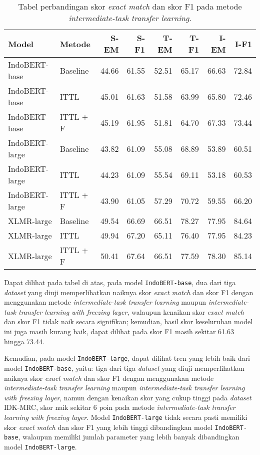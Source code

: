 \begin{table}[H]\centering
\begin{tabular}{llrrrrrr}
\toprule
         Model &   Metode &  S-EM &  S-F1 &  T-EM &  T-F1 &  I-EM &  I-F1 \\
\midrule
 IndoBERT-base & Baseline & 44.66 & 61.55 & 52.51 & 65.17 & 66.63 & 72.84 \\
 IndoBERT-base &     ITTL & 45.01 & 61.63 & 51.58 & 63.99 & 65.80 & 72.46 \\
 IndoBERT-base & ITTL + F & 45.19 & 61.95 & 51.81 & 64.70 & 67.33 & 73.44 \\
 \hline
IndoBERT-large & Baseline & 43.82 & 61.09 & 55.08 & 68.89 & 53.89 & 60.51 \\
IndoBERT-large &     ITTL & 44.23 & 61.09 & 55.54 & 69.11 & 53.18 & 60.53 \\
IndoBERT-large & ITTL + F & 43.90 & 61.05 & 57.29 & 70.72 & 59.55 & 66.20 \\
\hline
    XLMR-large & Baseline & 49.54 & 66.69 & 66.51 & 78.27 & 77.95 & 84.64 \\
    XLMR-large &     ITTL & 49.94 & 67.20 & 65.11 & 76.40 & 77.95 & 84.23 \\
    XLMR-large & ITTL + F & 50.41 & 67.64 & 66.51 & 77.59 & 78.30 & 85.14 \\
\bottomrule
\end{tabular}
\caption{Tabel perbandingan skor \emph{exact match} dan skor F1 pada metode \emph{intermediate-task transfer learning}.}
\end{table}

Dapat dilihat pada tabel di atas, pada model \texttt{IndoBERT-base}, dua dari tiga \emph{dataset} yang diuji memperlihatkan naiknya skor \emph{exact match} dan skor F1 dengan menggunakan metode \emph{intermediate-task transfer learning} maupun \emph{intermediate-task transfer learning with freezing layer}, walaupun kenaikan skor \emph{exact match} dan skor F1 tidak naik secara signifikan; kemudian, hasil skor keseluruhan model ini juga masih kurang baik, dapat dilihat pada skor F1 masih sekitar 61.63 hingga 73.44.

Kemudian, pada model \texttt{IndoBERT-large}, dapat dilihat tren yang lebih baik dari model \texttt{IndoBERT-base}, yaitu: tiga dari tiga \emph{dataset} yang diuji memperlihatkan naiknya skor \emph{exact match} dan skor F1 dengan menggunakan metode \emph{intermediate-task transfer learning} maupun \emph{intermediate-task transfer learning with freezing layer}, namun dengan kenaikan skor yang cukup tinggi pada \emph{dataset} IDK-MRC, skor naik sekitar 6 poin pada metode \emph{intermediate-task transfer learning with freezing layer}. Model \texttt{IndoBERT-large} tidak secara pasti memiliki skor \emph{exact match} dan skor F1 yang lebih tinggi dibandingkan model \texttt{IndoBERT-base}, walaupun memiliki jumlah parameter yang lebih banyak dibandingkan model \texttt{IndoBERT-large}.

